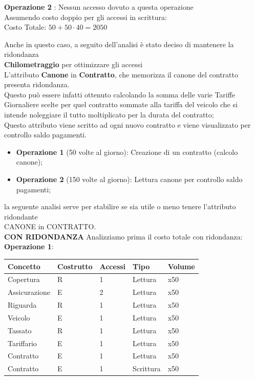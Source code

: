 \documentclass[10pt,a4paper]{article}
\begin{document}
\noindent
\textbf{Operazione 2 }: Nessun accesso dovuto a questa operazione\\


\noindent
Assumendo costo doppio per gli accessi in scrittura:\\
 Costo Totale: $50 + 50\cdot40 = 2050$


\noindent
Anche in questo caso, a seguito dell’analisi è stato deciso di mantenere la ridondanza\\ \textbf{Chilometraggio} per ottimizzare gli accessi\\


\noindent
L’attributo \textbf{Canone} in \textbf{Contratto}, che memorizza il canone del contratto  presenta ridondanza.\\
Questo può essere infatti ottenuto calcolando la somma delle varie Tariffe Giornaliere scelte per quel contratto sommate alla tariffa del veicolo che si intende noleggiare il tutto moltiplicato per la durata del contratto;\\
Questo attributo viene scritto ad ogni nuovo contratto e viene visualizzato per controllo saldo pagamenti.

\begin{itemize}
\item \textbf{Operazione 1} (50 volte al giorno): Creazione di un contratto (calcolo canone);
\item \textbf{Operazione 2} (150 volte al giorno): Lettura canone per controllo saldo pagamenti;
\end{itemize}

\noindent
la seguente analisi serve per stabilire se sia utile o meno tenere l’attributo ridondante \\CANONE in CONTRATTO.\\

\textbf{CON RIDONDANZA} Analizziamo prima il costo totale con ridondanza:\\

\textbf{Operazione 1}:\\
\begin{table} [h!]
\centering
\begin{tabular}{|p{2cm}|p{2cm}|p{2cm}|p{2cm}|p{1.5cm}|}
\hline
\textbf{Concetto} & \textbf{Costrutto} & \textbf{Accessi} & \textbf{Tipo} & \textbf{Volume} \\
\hline
Copertura & R & 1 & Lettura & x50 \\
\hline
Assicurazione & E & 2 & Lettura & x50 \\
\hline
Riguarda & R & 1 & Lettura & x50 \\
\hline
Veicolo & E & 1 & Lettura & x50 \\
\hline
Tassato & R & 1 & Lettura & x50 \\
\hline
Tariffario & E & 1 & Lettura & x50 \\
\hline
Contratto & E & 1 & Lettura & x50 \\
\hline
Contratto & E & 1 & Scrittura & x50 \\
\hline
\end{tabular}
\end{table}
\\
\end{document}
